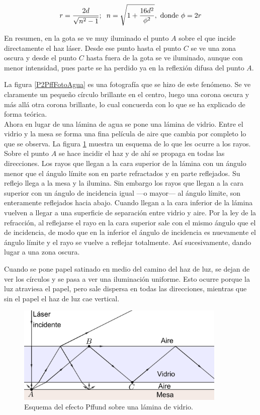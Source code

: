 \documentclass[12pt]{article}
\numberwithin{table}{section}
\numberwithin{figure}{section}
\numberwithin{equation}{section}
\begin{document}
\begin{equation}\label{P2PffRadioParvo}
	r=\frac{2d}{\sqrt{n^2-1}};\hspace{2mm}n=\sqrt{1+\frac{16d^2}{\phi^2}},\text{ donde }\phi=2r
\end{equation}

En resumen, en la gota se ve muy iluminado el punto $A$ sobre el que incide directamente el haz láser. Desde ese punto hasta el punto $C$ se ve una zona oscura y desde el punto $C$ hasta fuera de la gota se ve iluminado, aunque con menor intensidad, pues parte se ha perdido ya en la reflexión difusa del punto $A$.

La figura \ref{P2PffFotoAgua} es una fotografía que se hizo de este fenómeno. Se ve claramente un pequeño círculo brillante en el centro, luego una corona oscura y más allá otra corona brillante, lo cual concuerda con lo que se ha explicado de forma teórica.
\\

Ahora en lugar de una lámina de agua se pone una lámina de vidrio. Entre el vidrio y la mesa se forma una fina película de aire que cambia por completo lo que se observa. La figura \ref{P2PffVidrio} muestra un esquema de lo que les ocurre a los rayos. Sobre el punto $A$ se hace incidir el haz y de ahí se propaga en todas las direcciones. Los rayos que llegan a la cara superior de la lámina con un ángulo menor que el ángulo límite son en parte refractados y en parte reflejados. Su reflejo llega a la mesa y la ilumina. Sin embargo los rayos que llegan a la cara superior con un ángulo de incidencia igual ---o mayor--- al ángulo límite, son enteramente reflejados hacia abajo. Cuando llegan a la cara inferior de la lámina vuelven a llegar a una superficie de separación entre vidrio y aire. Por la ley de la refracción, al reflejarse el rayo en la cara superior sale con el mismo ángulo que el de incidencia, de modo que en la inferior el ángulo de incidencia es nuevamente el ángulo límite y el rayo se vuelve a reflejar totalmente. Así sucesivamente, dando lugar a una zona oscura.

Cuando se pone papel satinado en medio del camino del haz de luz, se dejan de ver los círculos y se pasa a ver una iluminación uniforme. Esto ocurre porque la luz atraviesa el papel, pero sale dispersa en todas las direcciones, mientras que sin el papel el haz de luz cae vertical.

\begin{figure}[!ht]
	\small \centering \sffamily
	\begin{center}
		\includegraphics[width=10cm]{P2PffVidrio.png}
		\caption{Esquema del efecto Pffund sobre una lámina de vidrio.}
		\label{P2PffVidrio}
	\end{center}
\end{figure}
\end{document}
